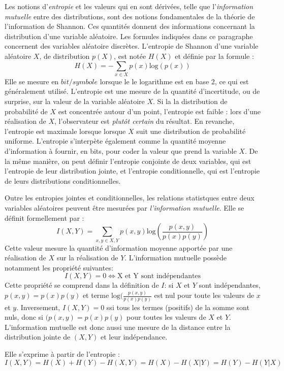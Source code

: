 Les notions d'\emph{entropie} et les valeurs qui en sont dérivées, telle que l'\emph{information mutuelle} entre des distributions, sont des notions fondamentales de la théorie de l'information de Shannon. Ces quantités donnent des informations concernant la distribution d'une variable aléatoire.
Les formules indiquées dans ce paragraphe concernent des variables aléatoire discrètes. 
L'entropie de Shannon d'une variable aléatoire $X$, de distribution $p(X)$, est notée $H(X)$ et définie par la formule : 
$$ H(X) = - \sum_{x \in X}{p(x)\textrm{log}(p(x))}$$
Elle se mesure en $bit/symbole$ lorsque le le logarithme est en base 2, ce qui est généralement utilisé. 
L'entropie est une mesure de la quantité d'incertitude, ou de surprise, sur la valeur de la variable aléatoire $X$. Si la la distribution de probabilité de $X$ est concentrée autour d'un point, l'entropie est faible : lors d'une réalisation de $X$, l'observateur est \emph{plutôt certain} du résultat. En revanche, l'entropie est maximale lorsque lorsque $X$ suit une distribution de probabilité uniforme.
L'entropie s'interpète également comme la quantité moyenne d'information à fournir, en bits, pour coder la valeur que prend la variable $X$.
De la même manière, on peut définir l'entropie conjointe de deux variables, qui est l'entropie de leur distribution jointe, et l'entropie conditionnelle, qui est l'entropie de leurs distributions conditionnelles.

Outre les entropies jointes et conditionnelles, les relations statistques entre deux variables aléatoires peuvent être mesurées par \emph{l'information mutuelle}. Elle se définit formellement par : 
$$ I(X,Y) = \sum_{x,y \in X,Y}{p(x,y)\textrm{log}(\frac{p(x,y)}{p(x)p(y)})}$$
Cette valeur mesure la quantité d'information moyenne apportée par une réalisation de $X$ sur la réalisation de $Y$. L'information mutuelle possède notamment les propriété suivantes: 
$$I(X,Y) = 0 \Leftrightarrow \textrm{X et Y sont indépendantes}$$
Cette propriété se comprend dans la définition de $I$: si $X$ et $Y$ sont indépendantes, $p(x,y)=p(x)p(y)$ et terme $\textrm{log}(\frac{p(x,y)}{p(x)p(y)}$ est nul pour toute les valeurs de $x$ et $y$. Inversement, $I(X,Y) =0$ ssi tous les termes (positifs) de la somme sont nuls, donc si $(p(x,y)=p(x)p(y)$ pour toutes les valeurs de $X$ et $Y$. L'information mutuelle est donc aussi une mesure de la distance entre la distribution jointe de $(X,Y)$ et leur indépendance.


Elle s'exprime à partir de l'entropie : $$I(X,Y) = H(X) + H(Y) - H(X,Y) = H(X) - H(X|Y) = H(Y) - H(Y|X)$$

